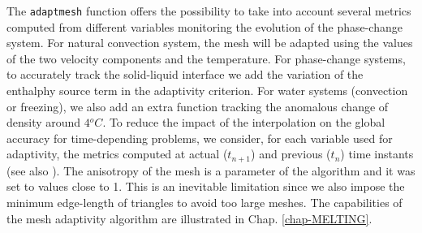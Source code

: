 The \texttt{adaptmesh} function offers the possibility to take into account several metrics computed from different variables monitoring the evolution of the phase-change system. For natural convection system, the mesh will be adapted using the values of the two velocity components and the temperature. For phase-change systems, to accurately track the solid-liquid interface we add the variation of the enthalphy source term in the adaptivity criterion. For  water systems (convection or freezing), we also add an extra function tracking the anomalous change of density around $4 {^o}C$. To reduce the impact of the interpolation on the global accuracy for time-depending problems, we consider, for each variable used for adaptivity,  the metrics computed at actual ($t_{n+1}$) and  previous ($t_{n}$) time instants (see also \cite{Belhamadia2004_S}). The anisotropy of the mesh is a parameter of the algorithm and it was set to values close to 1. This is an inevitable limitation since we also impose the minimum edge-length of triangles to avoid too large meshes.
The capabilities of the mesh adaptivity algorithm are illustrated in Chap. \ref{chap-MELTING}.

%

